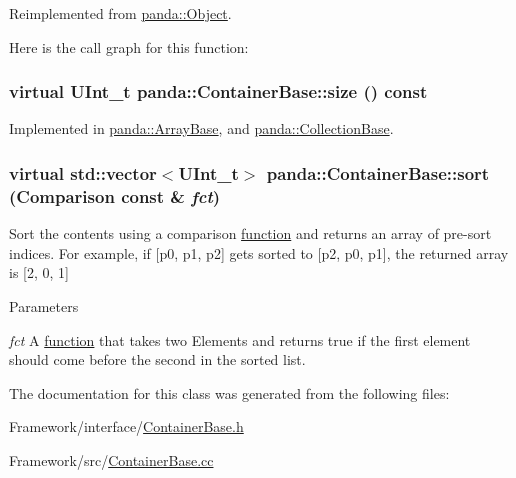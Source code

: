 Reimplemented from \hyperlink{classpanda_1_1Object_a282e820b1ad431db22ca4d4dd20b55e0}{panda::Object}.

Here is the call graph for this function:\hypertarget{classpanda_1_1ContainerBase_a4035294b020325b57cafa39fb459fd7a}{
\subsubsection[{size}]{\setlength{\rightskip}{0pt plus 5cm}virtual UInt\_\-t panda::ContainerBase::size () const}}
\label{classpanda_1_1ContainerBase_a4035294b020325b57cafa39fb459fd7a}


Implemented in \hyperlink{classpanda_1_1ArrayBase_aecde2cb03cafd4f1ba8ef2cff0abfb4d}{panda::ArrayBase}, and \hyperlink{classpanda_1_1CollectionBase_a341cdaab81b20671510b14476973369e}{panda::CollectionBase}.\hypertarget{classpanda_1_1ContainerBase_adf2484bf371fe51dd852301defb81d97}{
\subsubsection[{sort}]{\setlength{\rightskip}{0pt plus 5cm}virtual std::vector$<$UInt\_\-t$>$ panda::ContainerBase::sort ({\bf Comparison} const \& {\em fct})}}
\label{classpanda_1_1ContainerBase_adf2484bf371fe51dd852301defb81d97}


Sort the contents using a comparison \hyperlink{namespacepanda_1_1function}{function} and returns an array of pre-\/sort indices. For example, if \mbox{[}p0, p1, p2\mbox{]} gets sorted to \mbox{[}p2, p0, p1\mbox{]}, the returned array is \mbox{[}2, 0, 1\mbox{]}


\begin{DoxyParams}{Parameters}
\item[{\em fct}]A \hyperlink{namespacepanda_1_1function}{function} that takes two Elements and returns true if the first element should come before the second in the sorted list. \end{DoxyParams}


The documentation for this class was generated from the following files:\begin{DoxyCompactItemize}
\item 
Framework/interface/\hyperlink{ContainerBase_8h}{ContainerBase.h}\item 
Framework/src/\hyperlink{ContainerBase_8cc}{ContainerBase.cc}\end{DoxyCompactItemize}
